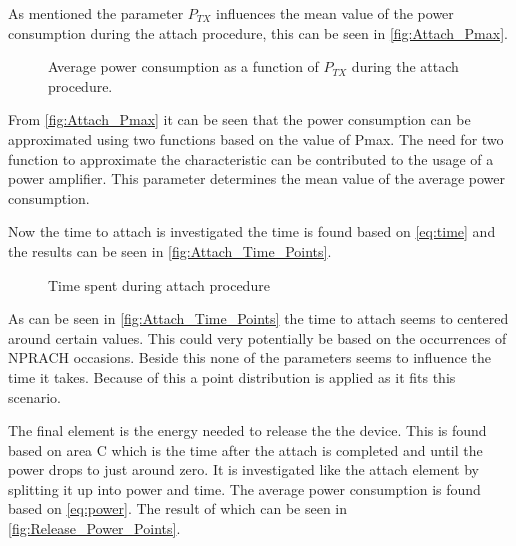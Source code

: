 As mentioned the parameter $P_{TX}$ influences the mean value of the power consumption during the attach procedure, this can be seen in \autoref{fig:Attach_Pmax}. 

\begin{figure}[H]
\centering
{}
\resizebox{0.7\textwidth}{!}{
}
\caption{Average power consumption as a function of $P_{TX}$ during the attach procedure.}
\label{fig:Attach_Pmax}
\end{figure}

From \autoref{fig:Attach_Pmax} it can be seen that the power consumption can be approximated using two functions based on the value of Pmax. The need for two function to approximate the characteristic can be contributed to the usage of a power amplifier. This parameter determines the mean value of the average power consumption. 

Now the time to attach is investigated the time is found based on \autoref{eq:time} and the results can be seen in \autoref{fig:Attach_Time_Points}.


\begin{figure}[H]
\centering
\begin{minipage}{0.48\textwidth}
\resizebox{\textwidth}{!}{
}
\end{minipage}
\hfill
\begin{minipage}{0.48\textwidth}
\resizebox{\textwidth}{!}{
}
\end{minipage}
\caption{Time spent during attach procedure}
\label{fig:Attach_Time_Points}
\end{figure}

As can be seen in \autoref{fig:Attach_Time_Points} the time to attach seems to centered around certain values. This could very potentially be based on the occurrences of NPRACH occasions. Beside this none of the parameters seems to influence the time it takes. Because of this a point distribution is applied as it fits this scenario. 

The final element is the energy needed to release the the device. This is found based on area C which is the time after the attach is completed and until the power drops to just around zero. It is investigated like the attach element by splitting it up into power and time. The average power consumption is found based on \autoref{eq:power}. The result of which can be seen in \autoref{fig:Release_Power_Points}.

